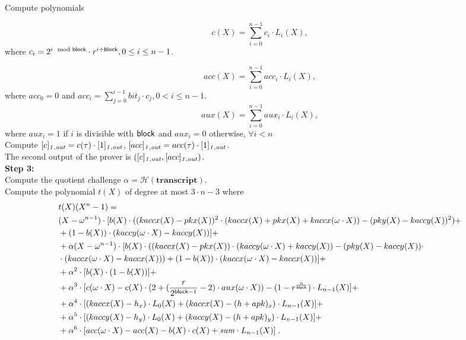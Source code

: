 \noindent Compute polynomials 

$$c(X) = \sum_{i=0}^{n-1} c_i \cdot L_{i}(X),$$ 
where $c_i =  2^{i\mod {\mathsf{block}}}\cdot r^{i\div \mathsf{block}}, 0 \leq i \leq n-1 $. 

$$acc(X) = \sum_{i=0}^{n-1} acc_i \cdot L_{i}(X),$$ 
where $acc_0 = 0$ and $acc_i = \sum_{j=0}^{i-1} \mathit{bit_j} \cdot c_j, 0 < i \leq n-1$. 
$$aux(X) = \sum_{i=0}^{n-1} aux_i \cdot L_{i}(X),$$
where $aux_{i} = 1$ if $i$ is divisible with $\mathsf{block}$ and $aux_{i} = 0$ otherwise, $\forall i < n$ \\

\noindent Compute $[c]_{\mathit{1,out}} = c(\tau) \cdot [1]_{\mathit{1,out}}$, $[acc]_{\mathit{1,out}} = acc(\tau) \cdot [1]_{\mathit{1,out}}$. \\

\noindent The second output of the prover is $([c]_{\mathit{1,out}}, [acc]_{\mathit{1,out}})$. \\

\noindent \textbf{Step 3:} \\
\noindent Compute the quotient challenge $\alpha = \mathcal{H}(\mathbf{transcript})$. \\

\noindent Compute the polynomial $t(X)$ of degree at most $3\cdot n - 3$  where 
\begin{align*}
&t(X)(X^n-1)  = \\  
&(X-\omega^{n-1}) \cdot [b(X) \cdot ((kaccx(X)-pkx(X))^2 \cdot (kaccx(X)+ pkx(X) + kaccx(\omega\cdot X)) - (pky(X)-kaccy(X))^2) + \\ 
& + (1-b(X))\cdot (kaccy(\omega\cdot X) - kaccy(X))] + \\
& +\alpha (X-\omega^{n-1})\cdot [b(X) \cdot ((kaccx(X) - pkx(X)) \cdot (kaccy(\omega \cdot X) + kaccy(X)) - (pky(X) - kaccy(X)) \cdot \\
&\cdot (kaccx(\omega \cdot X) - kaccx(X))) + (1-b(X)) \cdot (kaccx(\omega \cdot X) - kaccx(X))] + \\
& +\alpha^2 \cdot [b(X) \cdot (1-b(X))] + \\
& +\alpha^3 \cdot [c(\omega \cdot X) - c(X)\cdot (2+ (\frac{r}{2^{\mathsf{block} -1}} -2) \cdot aux(\omega \cdot X))- (1 - r^{\frac{n}{\mathsf{block}}}) \cdot L_{n-1}(X)] + \\ 
& +\alpha^4 \cdot [(kaccx(X) - h_x)\cdot L_0(X) + (kaccx(X) - (h + apk)_{x}) \cdot L_{n-1}(X)] + \\ 
& +\alpha^5 \cdot [(kaccy(X) - h_y)\cdot L_0(X) + (kaccy(X) - (h + apk)_{y}) \cdot L_{n-1}(X)] + \\
& +\alpha^6 \cdot [ acc(\omega \cdot X) - acc(X) - b(X)\cdot c(X) + \mathit{sum} \cdot L_{n-1}(X)] \; .
\end{align*}

